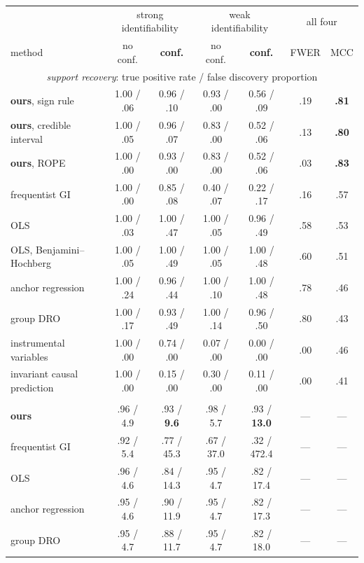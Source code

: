 	\begin{table}[!htbp]
	\centering
	\small
	\begin{tabular}{lcccc|cc}
	\hline
	& \multicolumn{2}{c}{strong identifiability} & \multicolumn{2}{c}{weak identifiability} & \multicolumn{2}{c}{all four}\\
	method & no conf. & \textbf{conf.} & no conf. & \textbf{conf.} & FWER & MCC\\
	\hline
	\multicolumn{7}{c}{\emph{support recovery}: true positive rate / false discovery proportion}\\
	\hline
	\textbf{ours}, sign rule & 1.00 / .06 & 0.96 / .10 & 0.93 / .00 & 0.56 / .09 & .19 & \textbf{.81}\\
	\textbf{ours}, credible interval & 1.00 / .05 & 0.96 / .07 & 0.83 / .00 & 0.52 / .06 & .13 & \textbf{.80}\\
	\textbf{ours}, ROPE & 1.00 / .00 & 0.93 / .00 & 0.83 / .00 & 0.52 / .06 & .03 & \textbf{.83}\\
	frequentist GI & 1.00 / .00 & 0.85 / .08 & 0.40 / .07 & 0.22 / .17 & .16 & .57\\
	OLS & 1.00 / .03 & 1.00 / .47 & 1.00 / .05 & 0.96 / .49 & .58 & .53\\
	OLS, Benjamini--Hochberg & 1.00 / .05 & 1.00 / .49 & 1.00 / .05 & 1.00 / .48 & .60 & .51\\
	anchor regression & 1.00 / .24 & 0.96 / .44 & 1.00 / .10 & 1.00 / .48 & .78 & .46\\
	group DRO & 1.00 / .17 & 0.93 / .49 & 1.00 / .14 & 0.96 / .50 & .80 & .43\\
	instrumental variables & 1.00 / .00 & 0.74 / .00 & 0.07 / .00 & 0.00 / .00 & .00 & .46\\
	invariant causal prediction & 1.00 / .00 & 0.15 / .00 & 0.30 / .00 & 0.11 / .00 & .00 & .41\\
	\specialrule{1pt}{0pt}{0pt}
	\multicolumn{7}{c}{\emph{prediction}: coverage / interval score, nominal $95\%$}\\
	\hline
	\textbf{ours} & .96 / 4.9 & .93 / \textbf{9.6} & .98 / 5.7 & .93 / \textbf{13.0} & --- & ---\\
	frequentist GI & .92 / 5.4 & .77 / 45.3 & .67 / 37.0 & .32 / 472.4 & --- & ---\\
	OLS & .96 / 4.6 & .84 / 14.3 & .95 / 4.7 & .82 / 17.4 & --- & ---\\
	anchor regression & .95 / 4.6 & .90 / 11.9 & .95 / 4.7 & .82 / 17.3 & --- & ---\\
	group DRO & .95 / 4.7 & .88 / 11.7 & .95 / 4.7 & .82 / 18.0 & --- & ---\\

\end{tabular}
\end{table}
